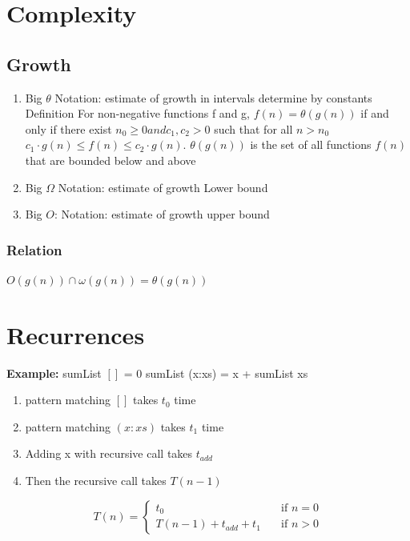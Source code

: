 \section{Complexity}
\subsection{Growth}
\begin{enumerate}
\item Big $ \theta $ Notation: estimate of growth in intervals determine by constants
  Definition
  For non-negative functions f and g, $f (n) = \theta (g (n))$ if and only if there
  exist $ n_0 \geq 0 and c_1 , c_2 > 0 $ such that for all $ n > n_0 $
  $ c_1 \cdot g (n) \leq f (n) \leq c_2 \cdot g (n) $.
  $ \theta (g (n)) $ is the set of all functions $ f(n) $ that are bounded below and above
\item Big $ \Omega $ Notation: estimate of growth Lower bound
\item Big $ O $: Notation: estimate of growth upper bound
\end{enumerate}


\subsubsection{Relation}
$O(g(n)) \cap \omega (g(n)) = \theta (g(n))$



\section{Recurrences}
\noindent\textbf{Example:} \newline
sumList $[]$ = 0 \newline
sumList (x:xs) = x + sumList xs

\begin{enumerate}
\item pattern matching $[]$ takes $t_0$ time
\item pattern matching $(x:xs)$ takes $t_1$ time
\item Adding x with recursive call takes $t_{add}$
\item Then the recursive call takes $T(n-1)$
\end{enumerate}

\[ T(n) =
  \begin{cases}
    t_0                   & \quad \text{if } n = 0 \\
    T(n-1)+t_{add} +t_{1}  & \quad \text{if } n > 0 
  \end{cases}
\]

